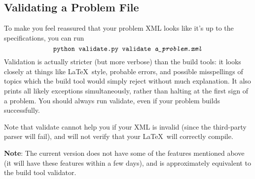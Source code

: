   \subsection{Validating a Problem File}
    To make you feel reassured that your problem XML looks like it's up to the specifications, you can run \[\texttt{python validate.py }\texttt{validate \textit{a\_problem.xml}}\] Validation is actually stricter (but more verbose) than the build tools: it looks closely at things like \LaTeX\ style, probable errors, and possible misspellings of topics which the build tool would simply reject without much explanation. It also prints all likely exceptions simultaneously, rather than halting at the first sign of a problem. You should always run validate, even if your problem builds successfully.
    
    Note that validate cannot help you if your XML is invalid (since the third-party parser will fail), and will not verify that your \LaTeX\ will correctly compile.
    
    \textbf{Note}: The current version does not have some of the features mentioned above (it will have these features within a few days), and is approximately equivalent to the build tool validator.